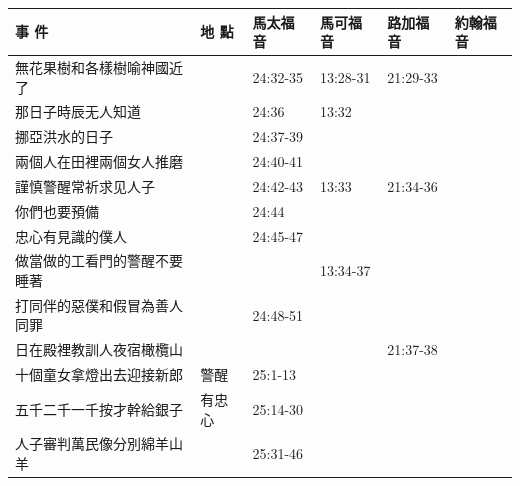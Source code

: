 \begin{table}[H] \centering
\begin{tabular}{p{14em}|p{7.93em}|l|l|l|p{4.855em}} \toprule
\textbf{事 件} & \textbf{地 點} & \multicolumn{1}{p{5.285em}|}{\textbf{馬太福音}} & \multicolumn{1}{p{5.57em}|}{\textbf{馬可福音}} & \multicolumn{1}{p{5.285em}|}{\textbf{路加福音}} & \textbf{約翰福音} \\  \midrule
無花果樹和各樣樹喻神國近了&       &24:32-35&13:28-31&21:29-33&  \\\midrule
那日子時辰无人知道&       &24:36&13:32&&  \\\midrule
挪亞洪水的日子&       &24:37-39&       &&  \\\midrule
兩個人在田裡兩個女人推磨&       &24:40-41&       &&  \\\midrule

謹慎警醒常祈求见人子&       & 24:42-43 &13:33&21:34-36&  \\\midrule
你們也要預備&       & 24:44 &       &&  \\\midrule
忠心有見識的僕人&       & 24:45-47&       &&  \\\midrule

做當做的工看門的警醒不要睡著&       & &13:34-37       &&  \\\midrule

打同伴的惡僕和假冒為善人同罪&       & 24:48-51&       &&  \\\midrule

日在殿裡教訓人夜宿橄欖山&       &       &       &21:37-38&  \\\midrule

十個童女拿燈出去迎接新郎&警醒 & 25:1-13&       &&  \\\midrule
五千二千一千按才幹給銀子&有忠心 & 25:14-30&       &&  \\\midrule
人子審判萬民像分別綿羊山羊&& 25:31-46&       &&  \\\midrule
\end{tabular}%
\end{table}




